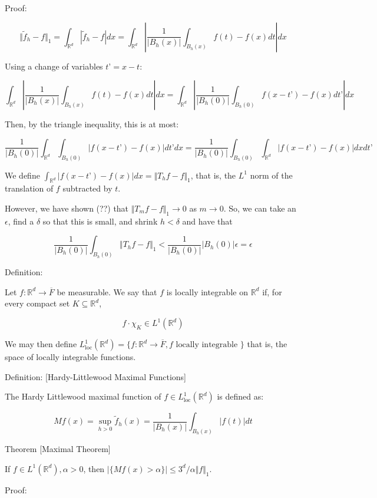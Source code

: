 \documentclass[10pt]{article}
\begin{document}
Proof:

$$\Vert \tilde{f}_h - f \Vert_1 = \int_{\mathbb{R}^d} | \tilde{f}_h - f  | dx = \int_{\mathbb{R}^d} \left| \frac{1}{|B_h(x)|} \int_{B_h(x)} f(t) - f(x) dt \right| dx$$

Using a change of variables $t’ = x-t$:

$$ \int_{\mathbb{R}^d} \left| \frac{1}{|B_h(x)|} \int_{B_h(x)} f(t) - f(x) dt \right| dx =  \int_{\mathbb{R}^d} \left| \frac{1}{|B_h(0)|} \int_{B_h(0)} f(x-t’) - f(x) dt’ \right| dx $$

Then, by the triangle inequality, this is at most:

$$ \frac{1}{|B_h(0)|} \int_{\mathbb{R}^d} \int_{B_h(0)} | f(x - t’) - f(x)| dt’ dx =  \frac{1}{|B_h(0)|} \int_{B_h(0)} \int_{\mathbb{R}^d} | f(x - t’) - f(x)| dx dt’$$

We define $\int_{\mathbb{R}^d} | f(x - t’) - f(x)| dx = \Vert T_hf - f \Vert_1$, that is, the $L^1$ norm of the translation of $f$ subtracted by $t$.

However, we have shown (??) that $\Vert T_m f - f \Vert_1 \to 0$ as $m \to 0$. So, we can take an $\epsilon$, find a $\delta$ so that this is small, and shrink $h < \delta$ and have that 

$$ \frac{1}{|B_h(0)|} \int_{B_h(0)}  \Vert T_hf - f \Vert_1 <  \frac{1}{|B_h(0)|} |B_h(0)| \epsilon  = \epsilon$$

Definition:

Let $f: \mathbb{R}^d \to \overline{F}$ be measurable. We say that $f$ is locally integrable on $\mathbb{R}^d$ if, for every compact set $K \subseteq \mathbb{R}^d$,

$$ f \cdot \chi_K \in L^1(\mathbb{R}^d)$$

We may then define $L^1_{\text{loc}}(\mathbb{R}^d) = \{ f: \mathbb{R}^d \to \overline{F}, f \text{ locally integrable } \} $ that is, the space of locally integrable functions.

Definition: [Hardy-Littlewood Maximal Functions]

The Hardy Littlewood maximal function of $f \in L^1_{\text{loc}}(\mathbb{R}^d)$ is defined as:

$$M f(x) = \sup_{h > 0} \tilde{f}_h(x) = \frac{1}{|B_h(x)|} \int_{B_h(x)} |f(t)| dt $$

Theorem [Maximal Theorem]

If $f \in L^1(\mathbb{R}^d), \alpha > 0$, then $| \{ Mf(x) > \alpha \}| \leq 3^d/\alpha \Vert f \Vert_1$.

Proof:
\end{document}
